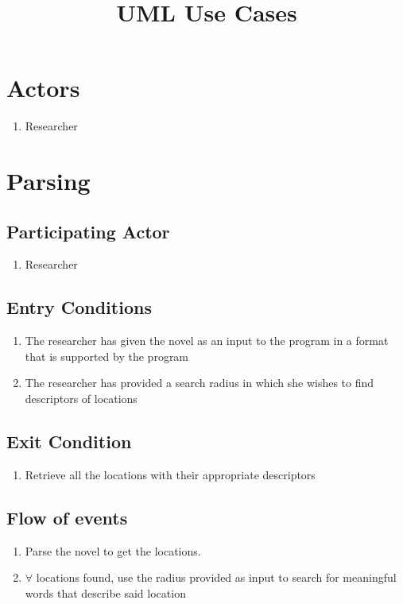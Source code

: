 \documentclass[21pt]{article}
\title{UML Use Cases}
\date{}
\begin{document}
\maketitle
\section{Actors}
\begin{enumerate}
\item Researcher
\end{enumerate}

\section{Parsing}
\subsection{Participating Actor}
\begin{enumerate}
\item Researcher
\end{enumerate}
\subsection{Entry Conditions}
\begin{enumerate}
\item The researcher has given the novel as an input to the program in a format that is supported by the program
\item The researcher has provided a search radius in which she wishes to find descriptors of locations
\end{enumerate}

\subsection{Exit Condition}
\begin{enumerate}
\item Retrieve all the locations with their appropriate descriptors
\end{enumerate}

\subsection{Flow of events}
\begin{enumerate}
\item Parse the novel to get the locations.
\item $\forall$ locations found, use the radius provided as input to search for meaningful words that describe said location
\end{enumerate}
\end{document}
